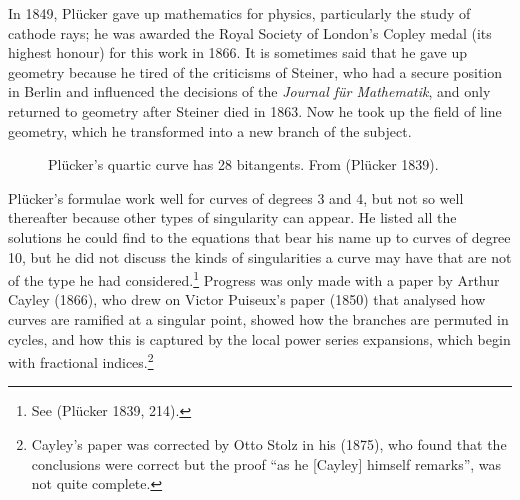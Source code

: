 In 1849, Pl\"ucker gave up mathematics for physics, particularly the study of cathode rays; he was awarded the Royal Society of London's Copley medal (its highest honour) for this work in 1866. It is sometimes said that he gave up geometry because he tired of the criticisms of Steiner, who had a secure position in Berlin and influenced the decisions of the \emph{Journal f\"ur Mathematik}, and only returned to geometry after Steiner died in 1863. Now he took up  the field of line geometry, which he transformed into a new branch of the subject. 

\begin{figure}
\caption{Pl\"ucker's quartic curve has 28 bitangents. From (Pl\"ucker 1839).}
      \label{fig28bitangents}
\end{figure}

Pl\"ucker's formulae work well for curves of degrees 3 and 4,  but not so well thereafter because other types of singularity can appear.   He listed all the solutions he could find to the equations that bear his name up to curves of degree 10, but he did not discuss the kinds of singularities a curve may have that are not of the type he had considered.\footnote{See (Pl\"ucker 1839, 214).}  Progress was only made with a paper by Arthur Cayley (1866), who drew on Victor Puiseux's paper (1850) that analysed  how curves are ramified at a singular point,  showed how the branches are permuted in cycles, and how this is captured by the local power series expansions, which begin with fractional indices.\footnote{Cayley's paper was corrected by Otto Stolz in his (1875), who found that the conclusions were correct but the proof ``as he [Cayley] himself remarks'', was not quite complete.}

